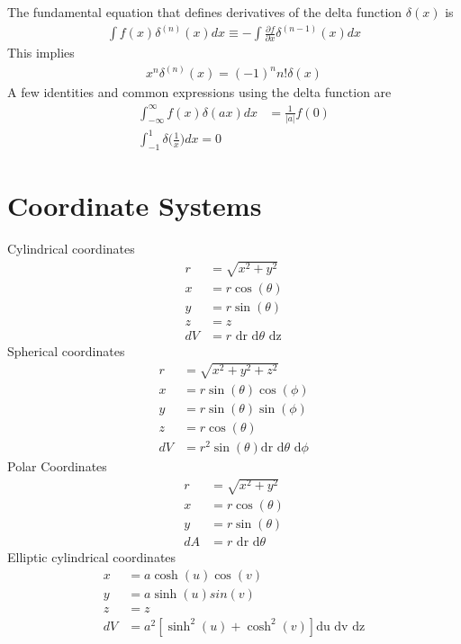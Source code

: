 The fundamental equation that defines derivatives of the delta function $\delta(x)$ is
\begin{align}
	\int f(x)\delta^{(n)}(x)dx \equiv -\int \frac{\partial f}{\partial x}\delta^{(n-1)}(x)dx
\end{align} 
This implies 
\begin{align}
	x^n\delta^{(n)}(x)=(-1)^nn!\delta(x)
\end{align}
A few identities and common expressions using the delta function are
\begin{align}
	\int_{-\infty}^{\infty}f(x)\delta(ax)dx &= \frac{1}{|a|}f(0) \\
	\int_{-1}^{1}\delta\bigg(\frac{1}{x}\bigg)dx = 0
\end{align}




\section{Coordinate Systems}
\begin{multicols}{2}
Cylindrical coordinates
\begin{align}
r&=\sqrt{x^2+y^2} \\
x&=r\cos(\theta) \\
y&=r\sin(\theta) \\
z&=z \\
dV&= r \textrm{ dr d$\theta$ dz}
\end{align}
Spherical coordinates
\begin{align}
r&=\sqrt{x^2+y^2+z^2} \\
x&=r\sin(\theta)\cos(\phi) \\
y&=r\sin(\theta)\sin(\phi) \\
z&=r\cos(\theta) \\
dV&=r^2\sin(\theta)\textrm{dr d$\theta$ d$\phi$}
\end{align}
Polar Coordinates
\begin{align}
	r&=\sqrt{x^2+y^2} \\
	x&=r\cos(\theta) \\
	y&=r\sin(\theta) \\
	dA&= r \textrm{ dr d$\theta$}
\end{align}
Elliptic cylindrical coordinates
\begin{align}
	x&= a \cosh(u) \cos(v) \\
	y&= a \sinh(u) sin(v) \\
	z&= z \\
	dV&=a^2[\sinh^2(u)+\cosh^2(v)]\textrm{du dv dz}
\end{align}
\end{multicols}




